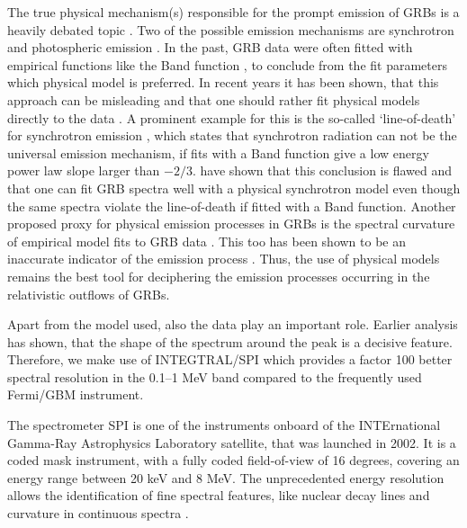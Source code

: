 \documentclass[twocolumn,traditabstract]{aa}
\begin{document}
The true physical mechanism(s) responsible for the prompt emission of GRBs is a heavily debated topic \citep[for a review see][]{KumarZhang2015}. %
Two of the possible emission mechanisms are synchrotron \citep[e.g.][]{syn_shell, bosnjak_syn, synch} and photospheric emission \citep[e.g.][]{Goodman1986, photo_1, photo_2, photo_3}. In the past, GRB data were often fitted with empirical functions like the Band function \citep{band}, to conclude from the fit parameters which physical model is preferred. In recent years it has been shown, that this approach can be misleading and that one should rather fit physical models directly to the data \citep{Burgess-2014, physical_models, synch}. A prominent example for this is the so-called `line-of-death' for synchrotron emission \citep{line-of-death, line-of-death2}, which states that synchrotron radiation can not be the universal emission mechanism, if fits with a Band function give a low energy power law slope larger than $-2/3$. \citet{synch} have shown that this conclusion is flawed and that one can fit GRB spectra well with a physical synchrotron model even though the same spectra violate the line-of-death if fitted with a Band function. Another proposed proxy for physical emission processes in GRBs is the spectral curvature of empirical model fits to GRB data \citep{Yu-2015, Axelsson-2015}. This too has been shown to be an inaccurate indicator of the emission process \citep{Burgess2019}. Thus, the use of physical models remains the best tool for deciphering the emission processes occurring in the relativistic outflows of GRBs.

Apart from the model used, also the data play an important role. Earlier analysis has shown, that the shape of the spectrum around the peak is a decisive feature. Therefore, we make use of INTEGTRAL/SPI which provides a factor 100 better spectral resolution in the 0.1--1 MeV band compared to the frequently used Fermi/GBM instrument.

The spectrometer SPI \citep{spi_main} is one of the instruments onboard of the INTErnational Gamma-Ray Astrophysics Laboratory \citep[INTEGRAL;][]{integral} satellite, that was launched in 2002. It is a coded mask instrument, with a fully coded field-of-view of 16 degrees, covering an energy range between 20 keV and 8 MeV. The unprecedented energy resolution allows the identification of fine spectral features, like nuclear decay lines \citep{Roques+2003, Diehl+2006} and curvature in continuous spectra \citep{Jourdain-2020}.
\end{document}
